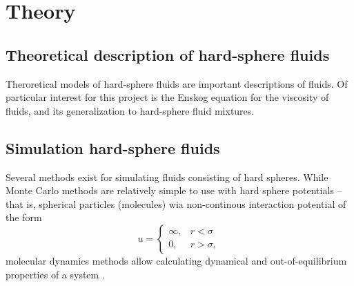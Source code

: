\section{Theory}
\label{sec:theory}
\subsection{Theoretical description of hard-sphere fluids}
Theroretical models of hard-sphere fluids are important descriptions of fluids.
Of particular interest for this project is the Enskog equation for the viscosity of fluids, and its generalization to hard-sphere fluid mixtures.

\subsection{Simulation hard-sphere fluids}
Several methods exist for simulating fluids consisting of hard spheres.
While Monte Carlo methods are relatively simple to use with hard sphere potentials -- that is, spherical particles (molecules) wia non-continous interaction potential of the form
\begin{equation}
    u = 
    \begin{cases}
        \infty, & r < \sigma \\
        0, & r > \sigma,
    \end{cases}
\end{equation}
molecular dynamics methods allow calculating dynamical and out-of-equilibrium properties of a system \cite{allen:MD_sim}.


